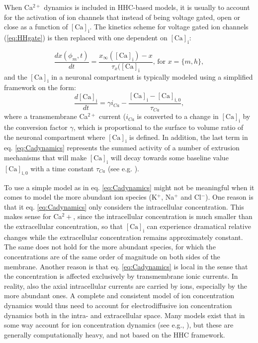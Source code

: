 When Ca$^{2+}$ dynamics is included in HHC-based models, it is usually to account for the activation of ion channels that instead of being voltage gated, open or close as a function of $\mathrm{[Ca]_i}$. The kinetics scheme for voltage gated ion channels (\ref{eq:HHgate}) is then replaced with one dependent on $\mathrm{[Ca]_i}$:

\begin{equation}
\frac{dx(\phi_m,t)}{dt} = \frac{x_{\infty}(\mathrm{[Ca]_i}) - x}{\tau_x(\mathrm{[Ca]_i}},  \, \text{for } x = \{m,h\},
\label{eq:Cagate}
\end{equation}
and the $\mathrm{[Ca]_i}$ in a neuronal compartment is typically modeled using a simplified framework on the form:
\begin{equation}
\frac{d\mathrm{[Ca]_i}}{dt} = \gamma i_{Ca} - \frac{\mathrm{[Ca]_i}-\mathrm{[Ca]_{i,0}}}{\tau_{Ca}}, 
\label{eq:Cadynamics}
\end{equation}
where a transmembrane Ca$^{2+}$ current ($i_{Ca}$ is converted to a change in $\mathrm{[Ca]_i}$ by the conversion factor $\gamma$, which is proportional to the surface to volume ratio of the neuronal compartment where $\mathrm{[Ca]_i}$ is defined. In addition, the last term in eq. \ref{eq:Cadynamics} represents the summed activity of a number of extrusion mechanisms that will make $\mathrm{[Ca]_i}$ will decay towards some baseline value $\mathrm{[Ca]_{i,0}}$ with a time constant $\tau_{Ca}$ (see e.g. \cite{Sterratt2011}).

To use a simple model as in eq. \ref{eq:Cadynamics} might not be meaningful when it comes to model the more abundant ion species (K$^{+}$, Na$^{+}$ and Cl$^{-}$). One reason is that it eq. \ref{eq:Cadynamics} only considers the intracellular concentration. This makes sense for Ca$^2+$, since the intracellular concentration is much smaller than the extracellular concentration, so that $\mathrm{[Ca]_i}$ can experience dramatical relative changes while the extracellular concentration remains approximately constant. The same does not hold for the more abundant species, for which the concentrations are of the same order of magnitude on both sides of the membrane. Another reason is that eq. \ref{eq:Cadynamics} is local in the sense that the concentration is affected exclusively by transmembrane ionic currents. In reality, also the axial intracellular currents are carried by ions, especially by the more abundant ones. A complete and consistent model of ion concentration dynamics would thus need to account for electrodiffusive ion concentration dynamics both in the intra- and extracellular space. Many models exist that in some way account for ion concentration dynamics (see e.g., \cite{Qian1989, Kager2000, kneller2002, Cressman2009, WeiUllahSchiff2014, newton2018, Saetra2020, ellingsrud2020}), but these are generally computationally heavy, and not based on the HHC framework.




